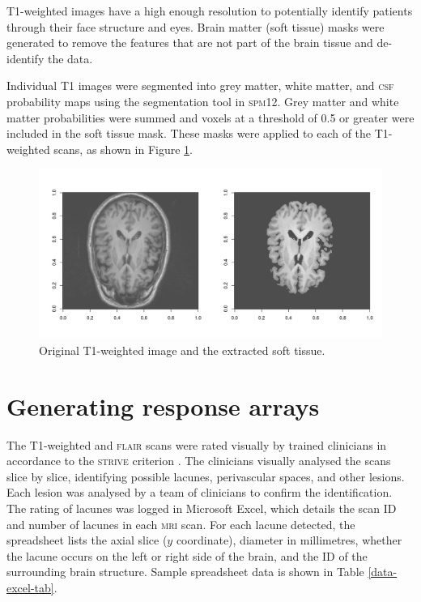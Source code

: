 T1-weighted images have a high enough resolution to potentially identify patients through their face structure and eyes. Brain matter (soft tissue) masks were generated to remove the features that are not part of the brain tissue and de-identify the data.

Individual T1 images were segmented into grey matter, white matter, and \textsc{csf} probability maps using the segmentation tool in \textsc{spm12}. Grey matter and white matter probabilities were summed and voxels at a threshold of 0.5 or greater were included in the soft tissue mask. These masks were applied to each of the T1-weighted scans, as shown in Figure \ref{data-t1-soft-fig}.

\begin{figure}[ht]
\centering
\includegraphics[width=\linewidth]{Images/6_t1_soft_eg.png}
\caption{Original T1-weighted image and the extracted soft tissue.}
\label{data-t1-soft-fig}
\end{figure}

\section{Generating response arrays}\label{data-lacune}

The T1-weighted and \textsc{flair} scans were rated visually by trained clinicians in accordance to the \textsc{strive} criterion \cite{WardlawJ.M.2013Nsfr}. The clinicians visually analysed the scans slice by slice, identifying possible lacunes, perivascular spaces, and other lesions. Each lesion was analysed by a team of clinicians to confirm the identification. The rating of lacunes was logged in Microsoft Excel, which details the scan ID and number of lacunes in each \textsc{mri} scan. For each lacune detected, the spreadsheet lists the axial slice ($y$ coordinate), diameter in millimetres, whether the lacune occurs on the left or right side of the brain, and the ID of the surrounding brain structure. Sample spreadsheet data is shown in Table \ref{data-excel-tab}.

